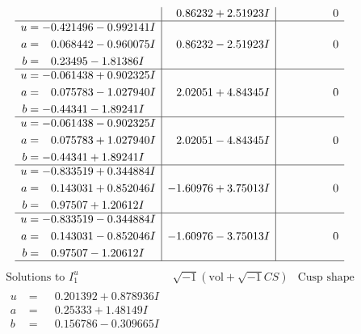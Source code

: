 \documentclass[1p]{elsarticle_modified}
\theoremstyle{definition}
\newcommand{\I}{\sqrt{-1}}
\begin{document}
$$\begin{array}{c|c|c}
 & \phantom{-}0.86232 + 2.51923 I & \phantom{-0.000000 } 0 \\ \hline\begin{aligned}
u &= -0.421496 - 0.992141 I \\
a &= \phantom{-}0.068442 - 0.960075 I \\
b &= \phantom{-}0.23495 - 1.81386 I\end{aligned}
 & \phantom{-}0.86232 - 2.51923 I & \phantom{-0.000000 } 0 \\ \hline\begin{aligned}
u &= -0.061438 + 0.902325 I \\
a &= \phantom{-}0.075783 - 1.027940 I \\
b &= -0.44341 - 1.89241 I\end{aligned}
 & \phantom{-}2.02051 + 4.84345 I & \phantom{-0.000000 } 0 \\ \hline\begin{aligned}
u &= -0.061438 - 0.902325 I \\
a &= \phantom{-}0.075783 + 1.027940 I \\
b &= -0.44341 + 1.89241 I\end{aligned}
 & \phantom{-}2.02051 - 4.84345 I & \phantom{-0.000000 } 0 \\ \hline\begin{aligned}
u &= -0.833519 + 0.344884 I \\
a &= \phantom{-}0.143031 + 0.852046 I \\
b &= \phantom{-}0.97507 + 1.20612 I\end{aligned}
 & -1.60976 + 3.75013 I & \phantom{-0.000000 } 0 \\ \hline\begin{aligned}
u &= -0.833519 - 0.344884 I \\
a &= \phantom{-}0.143031 - 0.852046 I \\
b &= \phantom{-}0.97507 - 1.20612 I\end{aligned}
 & -1.60976 - 3.75013 I & \phantom{-0.000000 } 0\\
 \hline 
 \end{array}$$\newpage$$\begin{array}{c|c|c}  
\text{Solutions to }I^u_{1}& \I (\text{vol} + \sqrt{-1}CS) & \text{Cusp shape}\\
 \hline 
\begin{aligned}
u &= \phantom{-}0.201392 + 0.878936 I \\
a &= \phantom{-}0.25333 + 1.48149 I \\
b &= \phantom{-}0.156786 - 0.309665 I\end{aligned}

\end{array}$$
\end{document}
